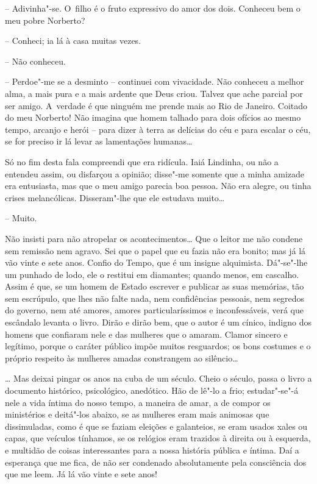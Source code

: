 -- Adivinha"-se. O~filho é o fruto expressivo do amor dos dois. Conheceu
bem o meu pobre Norberto?

-- Conheci; ia lá à casa muitas vezes.

-- Não conheceu.

-- Perdoe"-me se a desminto -- continuei com vivacidade. Não conheceu a
melhor alma, a mais pura e a mais ardente que Deus criou. Talvez que
ache parcial por ser amigo. A~verdade é que ninguém me prende mais ao
Rio de Janeiro. Coitado do meu Norberto! Não imagina que homem talhado
para dois ofícios ao mesmo tempo, arcanjo e herói -- para dizer à terra
as delícias do céu e para escalar o céu, se for preciso ir lá levar as
lamentações humanas\ldots{}

Só no fim desta fala compreendi que era ridícula. Iaiá Lindinha, ou não
a entendeu assim, ou disfarçou a opinião; disse"-me somente que a minha
amizade era entusiasta, mas que o meu amigo parecia boa pessoa. Não era
alegre, ou tinha crises melancólicas. Disseram"-lhe que ele estudava
muito\ldots{}

-- Muito.

Não insisti para não atropelar os acontecimentos\ldots{} Que o leitor me não
condene sem remissão nem agravo. Sei que o papel que eu fazia não era
bonito; mas já lá vão vinte e sete anos. Confio do Tempo, que é um
insigne alquimista. Dá"-se"-lhe um punhado de lodo, ele o restitui em
diamantes; quando menos, em cascalho. Assim é que, se um homem de Estado
escrever e publicar as suas memórias, tão sem escrúpulo, que lhes não
falte nada, nem confidências pessoais, nem segredos do governo, nem até
amores, amores particularíssimos e inconfessáveis, verá que escândalo
levanta o livro. Dirão e dirão bem, que o autor é um cínico, indigno dos
homens que confiaram nele e das mulheres que o amaram. Clamor sincero e
legítimo, porque o caráter público impõe muitos resguardos; os bons
costumes e o próprio respeito às mulheres amadas constrangem ao
silêncio\ldots{}

\ldots{} Mas deixai pingar os anos na cuba de um século. Cheio o século,
passa o livro a documento histórico, psicológico, anedótico. Hão de
lê"-lo a frio; estudar"-se"-á nele a vida íntima do nosso tempo, a maneira
de amar, a de compor os ministérios e deitá"-los abaixo, se as mulheres
eram mais animosas que dissimuladas, como é que se faziam eleições e
galanteios, se eram usados xales ou capas, que veículos tínhamos, se os
relógios eram trazidos à direita ou à esquerda, e multidão de coisas
interessantes para a nossa história pública e íntima. Daí a esperança
que me fica, de não ser condenado absolutamente pela consciência dos que
me leem. Já lá vão vinte e sete anos!

